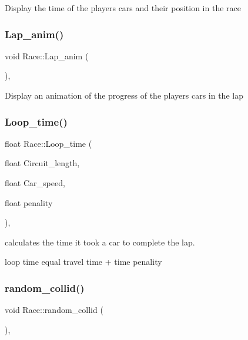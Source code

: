 Display the time of the player\textquotesingle{}s cars and their position in the race \mbox{\label{class_race_ac1ba3c7832ec62812a2fdd21f7fbd46c}} 
\subsubsection{\texorpdfstring{Lap\+\_\+anim()}{Lap\_anim()}}
{\footnotesize\ttfamily void Race\+::\+Lap\+\_\+anim (\begin{DoxyParamCaption}{ }\end{DoxyParamCaption})\hspace{0.3cm}{\ttfamily [static]}, {\ttfamily [private]}}

Display an animation of the progress of the player\textquotesingle{}s cars in the lap \mbox{\label{class_race_a75246185d954052dd7a0d19b4fdda1a4}} 
\subsubsection{\texorpdfstring{Loop\+\_\+time()}{Loop\_time()}}
{\footnotesize\ttfamily float Race\+::\+Loop\+\_\+time (\begin{DoxyParamCaption}\item[{float}]{Circuit\+\_\+length,  }\item[{float}]{Car\+\_\+speed,  }\item[{float}]{penality }\end{DoxyParamCaption})\hspace{0.3cm}{\ttfamily [static]}, {\ttfamily [private]}}

calculates the time it took a car to complete the lap.

loop time equal travel time + time penality \mbox{\label{class_race_a39c85f002d23e5f69eb41130d56d8a0f}} 
\subsubsection{\texorpdfstring{random\+\_\+collid()}{random\_collid()}}
{\footnotesize\ttfamily void Race\+::random\+\_\+collid (\begin{DoxyParamCaption}{ }\end{DoxyParamCaption})\hspace{0.3cm}{\ttfamily [static]}, {\ttfamily [private]}}

